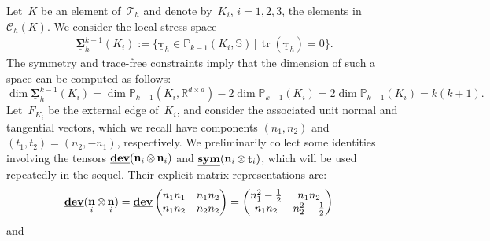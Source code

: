 \documentclass[a4paper,twoside,10pt]{article}
\theoremstyle{plain}
\theoremstyle{remark}
\theoremstyle{definition}
\numberwithin{equation}{section}
\numberwithin{figure}{section}
\newcommand{\Pbbkmo}{\mathbb{P}_{k-1}}
\newcommand{\Ccalh}{\mathcal{C}_h}
\newcommand{\Tauh}{\mathcal{T}_h}
\newcommand{\Sbb}{\mathbb{S}}
\newcommand{\Rbbdd}{\mathbb{R}^{d\times d}}
\newcommand{\K}{K}
\newcommand{\F}{F}
\newcommand{\Sigmah}{\underline{\boldsymbol{\Sigma}}_h}
\newcommand{\Sigmahkmo}{\Sigmah^{k-1}}
\newcommand{\taubfh}{\underline{\boldsymbol{\tau}}_h}
\DeclareMathOperator{\dev}{\underline{\mathbf{dev}}}
\DeclareMathOperator{\tr}{tr}
\newcommand{\sym}{\underline{\bf{sym}}}
\DeclareMathOperator{\norm}{\bf{n}}
\DeclareMathOperator{\tang}{\bf{t}}
\newcommand{\CcalhK}{\Ccalh(\K)}
\newcommand{\Ki}{{\K_i}}
\newcommand{\Fi}{{\F_{\Ki}}}
\newcommand{\ncompo}{n_1}
\newcommand{\ncompt}{n_2}
\newcommand{\tcompo}{t_1}
\newcommand{\tcompt}{t_2}
\newcommand{\normi}{\norm_i}
\newcommand{\tangi}{\tang_i}
\begin{document}
Let~$\K$ be an element of~$\Tauh$
and denote by~$\Ki$, $i=1,2,3$,
the elements in~$\CcalhK$.
We consider the local stress space
\begin{equation*}
\begin{split}
\Sigmahkmo(\Ki) := \{ \taubfh \in \Pbbkmo(\Ki,\Sbb)
\, | \,  \tr(\taubfh) = 0 \}.
\end{split}
\end{equation*}
The symmetry and trace-free constraints
imply that
the dimension of such a space can be computed as follows:
\begin{equation} \label{dim-sigmakmo}
\dim \Sigmahkmo(\Ki)
= \dim \Pbbkmo(\Ki,\Rbbdd)- 2\dim\Pbbkmo(\Ki)
= 2\dim\Pbbkmo(\Ki) = k(k+1).
\end{equation}
Let~$\Fi$ be the external edge of~$\Ki$,
and consider
the associated unit normal and tangential vectors,
which we recall have components
$(\ncompo,\ncompt)$
and
$(\tcompo,\tcompt) = (\ncompt,-\ncompo)$,
respectively.
We preliminarily collect some identities
involving the tensors
$\dev(\normi\otimes\normi)$
and
$\sym(\normi\otimes\tangi)$,
which will be used repeatedly in the sequel.
Their explicit matrix representations are:
\begin{equation*}
\begin{split}
\dev(\normi\otimes\normi)
&= \dev
\begin{pmatrix}
    \ncompo\ncompo  & \ncompo\ncompt   \\
    \ncompo\ncompt  & \ncompt\ncompt   
\end{pmatrix}
= \begin{pmatrix}
    \ncompo^2 - \frac12 & \ncompo\ncompt   \\
    \ncompo\ncompt  & \ncompt^2 - \frac12  
\end{pmatrix}
\end{split}
\end{equation*}
and
\end{document}
